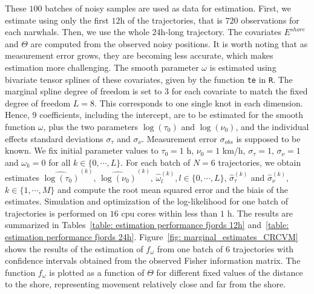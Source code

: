\documentclass[11pt]{article}
\newcommand {\1}{\mathbb{1}}
\theoremstyle{definition}
\theoremstyle{remark}
\theoremstyle{remark}
\begin{document}
These $100$ batches of noisy samples are used as data for estimation. First, we estimate using only the first $12$h of the trajectories, that is $720$ observations for each narwhals. Then, we use the whole $24$h-long trajectory. The covariates $E^{shore}$ and $\Theta$ are computed from the observed noisy positions. It is worth noting that as measurement error grows, they are becoming less accurate, which makes estimation more challenging. The smooth parameter $\omega$ is estimated using bivariate tensor splines of these covariates, given by the function \texttt{te} in \texttt{R}. The marginal spline degree of freedom is set to $3$ for each covariate to match the fixed degree of freedom $L=8$. This corresponds to one single knot in each dimension. Hence, $9$ coefficients, including the intercept, are to be estimated for the smooth function $\omega$, plus the two parameters $\log(\tau_0)$ and $\log(\nu_0)$, and the individual effects standard deviations $\sigma_{\tau}$ and $\sigma_{\nu}$. Measurement error $\sigma_{obs}$ is supposed to be known.  
We fix initial parameter values to $\tau_{0}=1$ h, $\nu_{0} = 1$ km/h, $\sigma_{\tau}=1$, $\sigma_{\nu}=1$ and $\omega_k=0$ for all $k \in \{0,\cdots,L\}$. 
For each batch of $N=6$ trajectories, we obtain estimates $\widehat{\log(\tau_{0})}^{(k)}$, $\widehat{\log(\nu_{0})}^{(k)}$, $\hat{\omega}_l^{(k)}, l \in \{0,\cdots, L\}$, $\hat{\sigma}_{\tau}^{(k)}$ and $\hat{\sigma}_{\nu}^{(k)}$, $k \in \{1,\cdots,M\}$ and compute the root mean squared error and the biais of the estimates. Simulation and optimization of the log-likelihood for one batch of trajectories is performed on $16$ cpu cores within less than $1$ h. The results are summarized in Tables~\ref{table: estimation performance fjords 12h} and~\ref{table: estimation performance fjords 24h}.
Figure~\ref{fig: marginal_estimates_CRCVM} shows the results of the estimation of $f_{\omega}$ from one batch of $6$ trajectories with confidence intervals obtained from the observed Fisher information matrix. The function $f_{\omega}$  is plotted as a function of $\Theta$ for different fixed values of the distance to the shore, representing movement relatively close and far from the shore.
\end{document}

